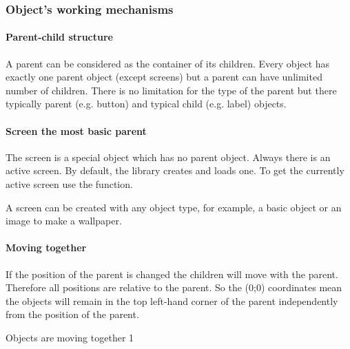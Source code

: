 \documentclass[letterpaper,10pt,english]{sphinxmanual}
\begin{document}
\subsubsection{Object’s working mechanisms}
\label{\detokenize{overview/objects:object-s-working-mechanisms}}

\paragraph{Parent-child structure}
\label{\detokenize{overview/objects:parent-child-structure}}
A parent can be considered as the container of its children. Every object has exactly one parent object (except screens) but a parent can have unlimited number of children. There is no limitation for the type of the parent but there typically parent (e.g. button) and typical child (e.g. label) objects.


\paragraph{Screen \textendash{} the most basic parent}
\label{\detokenize{overview/objects:screen-the-most-basic-parent}}
The screen is a special object which has no parent object. Always there is an active screen. By default, the library creates and loads one. To get the currently active screen use the  function.

A screen can be created with any object type, for example, a basic object or an image to make a wallpaper.


\paragraph{Moving together}
\label{\detokenize{overview/objects:moving-together}}
If the position of the parent is changed the children will move with the parent. Therefore all positions are relative to the parent. So the (0;0) coordinates mean the objects will remain in the top left-hand corner of the parent independently from the position of the parent.

Objects are moving together 1
\end{document}
